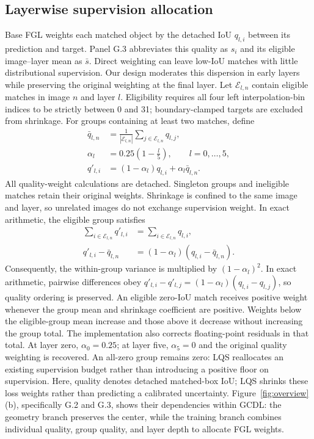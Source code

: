 \subsection{Layerwise supervision allocation}
\label{sec:lrssupervision}
Base FGL weights each matched object by the detached IoU $q_{l,i}$ between its prediction and target. Panel G.3 abbreviates this quality as $s_i$ and its eligible image--layer mean as $\bar s$. Direct weighting can leave low-IoU matches with little distributional supervision. Our design moderates this dispersion in early layers while preserving the original weighting at the final layer. Let $\mathcal E_{l,n}$ contain eligible matches in image $n$ and layer $l$. Eligibility requires all four left interpolation-bin indices to be strictly between 0 and 31; boundary-clamped targets are excluded from shrinkage. For groups containing at least two matches, define
\begin{equation}
\begin{aligned}
\bar q_{l,n}&=\frac{1}{|\mathcal E_{l,n}|}
\sum_{j\in\mathcal E_{l,n}}q_{l,j},\\
\alpha_l&=0.25\left(1-\frac{l}{5}\right),\qquad l=0,\ldots,5,\\
q'_{l,i}&=(1-\alpha_l)q_{l,i}+\alpha_l\bar q_{l,n}.
\end{aligned}
\label{eq:lrs}
\end{equation}
All quality-weight calculations are detached. Singleton groups and ineligible matches retain their original weights. Shrinkage is confined to the same image and layer, so unrelated images do not exchange supervision weight. In exact arithmetic, the eligible group satisfies
\begin{equation}
\begin{aligned}
\sum_{i\in\mathcal E_{l,n}}q'_{l,i}
&=\sum_{i\in\mathcal E_{l,n}}q_{l,i},\\
q'_{l,i}-\bar q_{l,n}
&=(1-\alpha_l)(q_{l,i}-\bar q_{l,n}).
\end{aligned}
\label{eq:lrsproperties}
\end{equation}
Consequently, the within-group variance is multiplied by $(1-\alpha_l)^2$. In exact arithmetic, pairwise differences obey $q'_{l,i}-q'_{l,j}=(1-\alpha_l)(q_{l,i}-q_{l,j})$, so quality ordering is preserved. An eligible zero-IoU match receives positive weight whenever the group mean and shrinkage coefficient are positive. Weights below the eligible-group mean increase and those above it decrease without increasing the group total. The implementation also corrects floating-point residuals in that total. At layer zero, $\alpha_0=0.25$; at layer five, $\alpha_5=0$ and the original quality weighting is recovered. An all-zero group remains zero: LQS reallocates an existing supervision budget rather than introducing a positive floor on supervision. Here, quality denotes detached matched-box IoU; LQS shrinks these loss weights rather than predicting a calibrated uncertainty. Figure~\ref{fig:overview}(b), specifically G.2 and G.3, shows their dependencies within GCDL: the geometry branch preserves the center, while the training branch combines individual quality, group quality, and layer depth to allocate FGL weights.



